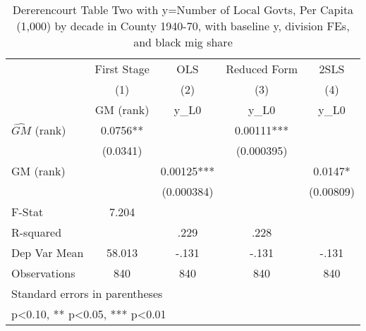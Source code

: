 \begin{table}[htbp]\centering
\def\sym#1{\ifmmode^{#1}\else\(^{#1}\)\fi}
\caption{Dererencourt Table Two with y=Number of Local Govts, Per Capita (1,000) by decade in County 1940-70, with baseline y, division FEs, and black mig share}
\begin{tabular}{l*{4}{c}}
\toprule
                    & First Stage   &         OLS   &Reduced Form   &        2SLS   \\
                    &\multicolumn{1}{c}{(1)}&\multicolumn{1}{c}{(2)}&\multicolumn{1}{c}{(3)}&\multicolumn{1}{c}{(4)}\\
                    &\multicolumn{1}{c}{GM  (rank)}&\multicolumn{1}{c}{y\_L0}&\multicolumn{1}{c}{y\_L0}&\multicolumn{1}{c}{y\_L0}\\
\midrule
$\hat{GM}$ (rank)   &      0.0756** &               &     0.00111***&               \\
                    &    (0.0341)   &               &  (0.000395)   &               \\
\addlinespace
GM  (rank)          &               &     0.00125***&               &      0.0147*  \\
                    &               &  (0.000384)   &               &   (0.00809)   \\
\midrule
F-Stat              &       7.204   &               &               &               \\
R-squared           &               &        .229   &        .228   &               \\
Dep Var Mean        &      58.013   &       -.131   &       -.131   &       -.131   \\
Observations        &         840   &         840   &         840   &         840   \\
\bottomrule
\multicolumn{5}{l}{\footnotesize Standard errors in parentheses}\\
\multicolumn{5}{l}{\footnotesize * p<0.10, ** p<0.05, *** p<0.01}\\
\end{tabular}
\end{table}
